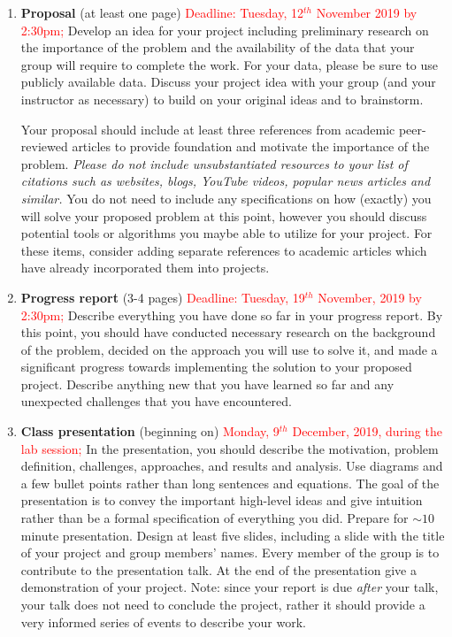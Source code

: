 \begin{enumerate}
\item \textbf{Proposal} (at least one page) \textcolor{red}{Deadline: Tuesday, 12$^{th}$ November 2019 by 2:30pm;} Develop an idea for your project including preliminary research on the importance of the problem and the availability of the data that your group will require to complete the work. For your data, please be sure to use publicly available data. Discuss your project idea with your group (and your instructor as necessary) to build on your original ideas and to brainstorm. 

Your proposal should include at least three references from academic peer-reviewed articles to provide foundation and motivate the importance of the problem. \emph{Please do not include unsubstantiated resources to your list of citations such as websites, blogs, YouTube videos, popular news articles and similar.} You do not need to include any specifications on how (exactly) you will solve your proposed problem at this point, however you should discuss potential tools or algorithms you maybe able to utilize for your project. For these items, consider adding separate references to academic articles which have already incorporated them into projects.

\item \textbf{Progress report} (3-4 pages) \textcolor{red}{Deadline: Tuesday, 19$^{th}$ November, 2019 by 2:30pm;} Describe everything you have done so far in your progress report. By this point, you should have conducted necessary research on the background of the problem, decided on the approach you will use to solve it, and made a significant progress towards implementing the solution to your proposed project. Describe anything new that you have learned so far and any unexpected challenges that you have encountered.

\item \textbf{Class presentation} (beginning on) \textcolor{red} {Monday, 9$^{th}$ December, 2019, during the lab session;} In the presentation, you should describe the motivation, problem definition, challenges, approaches, and results and analysis. Use diagrams and a few bullet points rather than long sentences and equations. The goal of the presentation is to convey the important high-level ideas and give intuition rather than be a formal specification of everything you did. Prepare for $\sim 10$ minute presentation. Design at least five slides, including a slide with the title of your project and group members' names. Every member of the group is to contribute to the presentation talk. At the end of the presentation give a demonstration of your project. Note: since your report is due \emph{after} your talk, your talk does not need to conclude the project, rather it should provide a very informed series of events to describe your work.
 

\end{enumerate}

